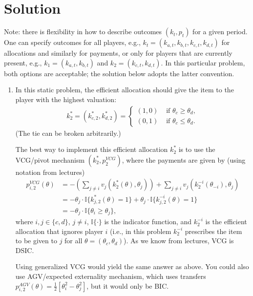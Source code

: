 \documentclass[a4paper]{article}
\newif\ifsolutions
\begin{document}
	
\ifsolutions
\section*{Solution}
	Note: there is flexibility in how to describe outcomes $(k_t,p_t)$ for a given period. One can specify outcomes for all players, e.g., $k_t = (k_{a,t},k_{b,t},k_{c,t},k_{d,t})$ for allocations and similarly for payments, or only for players that are currently present, e.g., $k_1 = (k_{a,t},k_{b,t})$ and $k_2 = (k_{c,t},k_{d,t})$. In this particular problem, both options are acceptable; the solution below adopts the latter convention.
	\begin{enumerate}
		\item In this static problem, the efficient allocation should give the item to the player with the highest valuation:
		\begin{align*}
			k^*_2 = (k^*_{c,2},k^*_{d,2}) = 
			\begin{cases}
				(1,0) & \text{ if } \theta_c \geq \theta_d,
				\\
				(0,1) & \text{ if } \theta_c \leq \theta_d.
			\end{cases}
		\end{align*}
		(The tie can be broken arbitrarily.)
		
		The best way to implement this efficient allocation $k^*_2$ is to use the VCG/pivot mechanism $(k^*_2,p^{VCG}_2)$, where the payments are given by (using notation from lectures)
		\begin{align*}
			p^{VCG}_{i,2} (\theta) &= -\left(\sum_{j\neq i}  v_{j}(k^*_2(\theta), \theta_{j}) \right) + \sum_{j\neq i} v_{j}(k^{-i}_2(\theta_{-i}), \theta_{j})
			\\
			&= - \theta_j \cdot \mathbb{I} \{ k^*_{j,2} (\theta) = 1 \} + \theta_j \cdot \mathbb{I} \{ k^{-i}_{j,2} (\theta) = 1 \}
			\\
			&= -\theta_j \cdot \mathbb{I} \{ \theta_i \geq \theta_j \},
		\end{align*}
		where $i,j \in \{c,d\}$, $j\neq i$, $\mathbb{I} \{\cdot\}$ is the indicator function, and $k^{-i}_2$ is the efficient allocation that ignores player $i$ (i.e., in this problem $k^{-i}_2$ prescribes the item to be given to $j$ for all $\theta=(\theta_c,\theta_d)$). As we know from lectures, VCG is DSIC.
		
		Using generalized VCG would yield the same answer as above. You could also use AGV/expected externality mechanism, which uses transfers $p^{AGV}_{i,2} (\theta) = \frac{1}{2} \left[ \theta_i^2 - \theta_j^2 \right]$, but it would only be BIC.
		

\end{enumerate}
\end{document}
